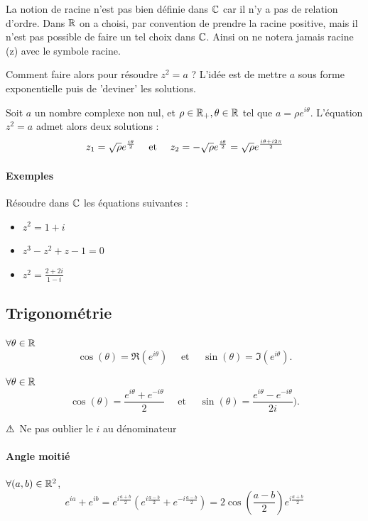 \documentclass[a4paper, 11pt]{article}
\begin{document}
La notion de racine n'est pas bien définie dans $\mathbb{C}$ car il n'y a pas de relation d'ordre. Dans $\mathbb{R}$ on a choisi, par convention de prendre la racine positive, mais il n'est pas possible de faire un tel choix dans $\mathbb{C}$. Ainsi on ne notera jamais racine (z) avec le symbole racine. 

Comment faire alors pour résoudre $z^2=a$ ? L'idée est de mettre $a$ sous forme exponentielle puis de 'deviner' les solutions. 

\begin{theorem}
Soit $a$ un nombre complexe non nul, et $\rho\in \mathbb{R}_+, \theta\in \mathbb{R}$ tel que $a=\rho e^{i\theta}$. L'équation  $z^2=a$ admet alors deux solutions : 
$$z_1 = \sqrt{\rho} e^{\frac{i\theta}{2}} \quad \text{ et } \quad z_2 = -\sqrt{\rho} e^{\frac{i\theta}{2}}  =\sqrt{\rho} e^{\frac{i\theta +i2\pi}{2}} $$
\end{theorem}

\paragraph{Exemples}
Résoudre dans $\mathbb{C}$ les équations suivantes :
\begin{itemize}
\item  $z^2=1+i$ 
\item $z^3-z^2+z-1=0$
\item $z^2=\frac{2+2i}{1-i}$
\end{itemize}






\subsection{Trigonométrie}
\begin{prop}
$\forall \theta \in \mathbb{R}$ 
$$\cos(\theta) =\Re(e^{i\theta}) \quad \text{ et } \quad \sin(\theta) =\Im(e^{i\theta}).$$
\end{prop}

\begin{prop}
$\forall \theta \in \mathbb{R}$ 
$$\cos(\theta) =\frac{e^{i\theta}+e^{-i\theta}}{2} \quad \text{ et } \quad \sin(\theta) =\frac{e^{i\theta}-e^{-i\theta}}{2i} ).$$
\end{prop}
$\warning \, $ Ne pas oublier le $i$ au dénominateur 


\paragraph{Angle moitié}
$\forall (a,b)\in \mathbb{R}^2$, 
$$e^{ia}+e^{ib} = e^{i\frac{a+b}{2}} \left( e^{i\frac{a-b}{2}} +e^{-i\frac{a-b}{2}}  \right) =2\cos\left( {\frac{a-b}{2}} \right) e^{i\frac{a+b}{2}} $$
\end{document}
